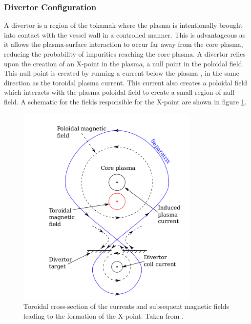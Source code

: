 	
	\subsubsection{Divertor Configuration}
	A divertor is a region of the tokamak where the plasma is intentionally brought into contact with the vessel wall in a controlled manner. This is advantageous as it  allows the plasma-surface interaction to occur far away from the core plasma, reducing the probability of impurities reaching the core plasma. A divertor relies upon the creation of an X-point in the plasma, a null point in the poloidal field. This null point is created by running a current below the plasma , in the same direction as the toroidal plasma current. This current also creates a poloidal field which interacts with the plasma poloidal field to create a small region of null field. A schematic for the fields responsible for the X-point are shown in figure \ref{fig:X-point}.    
	\begin{figure}[H]
		\centering
		\includegraphics[width=0.8\textwidth]{seperatrix}
		\caption{Toroidal cross-section of the currents and subsequent magnetic fields leading to the formation of the X-point. Taken from \cite{nick}.}
		\label{fig:X-point}
	\end{figure} 
	
